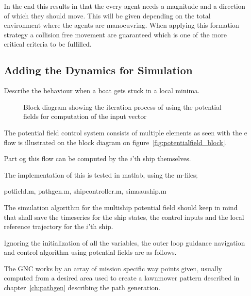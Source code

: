 In the end this results in that the every agent needs a magnitude and a direction of which they should move. This will be given depending on the total environment where the agents are manoeuvring. When applying this formation strategy a collision free movement are guaranteed which is one of the more critical criteria to be fulfilled. 



\subsection{Adding the Dynamics for Simulation}

Describe the behaviour when a boat gets stuck in a local minima.

\begin{figure}[htbp]
\centering

\caption{Block diagram showing the iteration process of using the
potential fields for computation of the input vector}
\label{fig:potentialfield_block}
\end{figure}

The potential field control system consists of multiple elements
as seen with the e flow is illustrated on the block diagram on
figure~\vref{fig:potentialfield_block}.

Part og this flow can be computed by the $i$'th ship themselves.

The implementation of this is tested in matlab, using the m-files;

potfield.m, pathgen.m, shipcontroller.m, simaauship.m

The simulation algorithm for the multiship potential field should keep
in mind that shall save the timeseries for the ship states, the
control inputs and the local reference trajectory for the $i$'th ship.

Ignoring the initialization of all the variables, the outer loop
guidance navigation and control algorithm using potential fields are
as follows.

The \ac{GNC} works by an array of mission specific way points given,
usually computed from a desired area used to create a lawnmower
pattern described in chapter~\vref{ch:pathgen} describing the path
generation.

